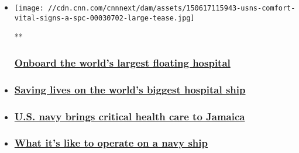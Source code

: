 \begin{itemize}
\item
  \href{/videos/world/2015/06/17/usns-comfort-vital-signs-a-spc.cnn}{}

  \texttt{[image: //cdn.cnn.com/cnnnext/dam/assets/150617115943-usns-comfort-vital-signs-a-spc-00030702-large-tease.jpg]}

  **

  \hypertarget{onboard-the-worlds-largest-floating-hospital}{%
  \subsubsection{\texorpdfstring{\href{/videos/world/2015/06/17/usns-comfort-vital-signs-a-spc.cnn}{Onboard
  the world's largest floating
  hospital}}{Onboard the world's largest floating hospital}}\label{onboard-the-worlds-largest-floating-hospital}}
\item
  \hypertarget{saving-lives-on-the-worlds-biggest-hospital-ship}{%
  \subsubsection{\texorpdfstring{\href{/2015/07/09/health/usns-comfort-hospital-ship/index.html}{Saving
  lives on the world's biggest hospital
  ship}}{Saving lives on the world's biggest hospital ship}}\label{saving-lives-on-the-worlds-biggest-hospital-ship}}
\item
  \hypertarget{us-navy-brings-critical-health-care-to-jamaica}{%
  \subsubsection{\texorpdfstring{\href{/videos/world/2015/06/17/usns-comfort-vital-signs-b-spc.cnn}{U.S.
  navy brings critical health care to
  Jamaica}}{U.S. navy brings critical health care to Jamaica}}\label{us-navy-brings-critical-health-care-to-jamaica}}
\item
  \hypertarget{what-its-like-to-operate-on-a-navy-ship}{%
  \subsubsection{\texorpdfstring{\href{/videos/world/2015/06/17/usns-comfort-vital-signs-c-spc.cnn}{What
  it's like to operate on a navy
  ship}}{What it's like to operate on a navy ship}}\label{what-its-like-to-operate-on-a-navy-ship}}
\end{itemize}

